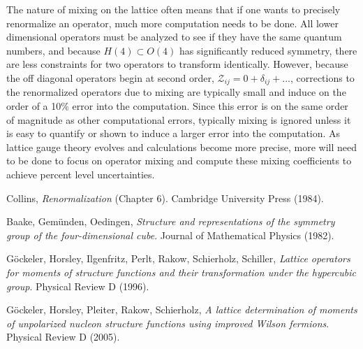 \documentclass[11pt, oneside]{article}   	%
\theoremstyle{definition}
\begin{document}
The nature of mixing on the lattice often means that if one wants to precisely renormalize an operator, much more 
computation needs to be done. All lower dimensional operators must be analyzed to see if they have 
the same quantum numbers, and because $H(4)\subset O(4)$ has significantly reduced symmetry, there are less 
constraints for two operators to transform identically. However, because the off diagonal operators begin at second 
order, $\mathcal Z_{ij} = 0 + \delta_{ij} + ...$, corrections to the renormalized operators due to mixing are typically small 
and induce on the order of a 10\% error into the computation. Since this error is on the same order of magnitude as 
other computational errors, typically mixing is ignored unless it is easy to quantify or shown to induce a larger error into 
the computation. As lattice gauge theory evolves and calculations become more precise, more will need to be done to 
focus on operator mixing and compute these mixing coefficients to achieve percent level uncertainties. 

\newpage
\thispagestyle{empty}

\begin{thebibliography}{99}

Collins, \textit{Renormalization} (Chapter 6). Cambridge University Press (1984). 

Baake, Gem\"unden, Oedingen, \textit{Structure and representations of the symmetry group of the four-dimensional cube}. 
Journal of Mathematical Physics (1982).

G\"{o}ckeler, Horsley, Ilgenfritz, Perlt, Rakow, Schierholz, Schiller, \textit{Lattice operators for moments of structure functions and 
their transformation under the hypercubic group}. Physical Review D (1996).

G\"ockeler, Horsley, Pleiter, Rakow, Schierholz, \textit{A lattice determination of moments of unpolarized nucleon 
structure functions using improved Wilson fermions}. Physical Review D (2005).

\end{thebibliography}
\end{document}
